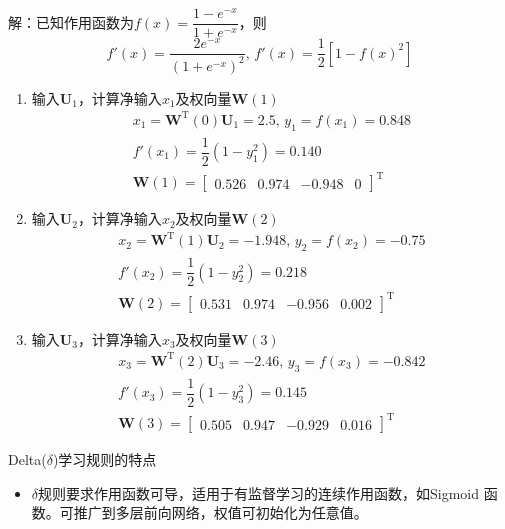 \begin{example}
    \textcolor{main1}{解：}已知作用函数为$f(x) = \dfrac{1-e^{-x}}{1+e^{-x}}$，则
    \[
        f'(x) = \dfrac{2e^{-x}}{\left( 1+e^{-x} \right)^2},\,f'(x) = \dfrac{1}{2}\left[ 1-f(x)^2 \right]
    \]
    \begin{enumerate}
        \item 输入$\boldsymbol{U}_1$，计算净输入$x_{1}$及权向量$\boldsymbol{W}(1)$
        \[
            \begin{array}{l}
                x_1 = \boldsymbol{W}^{\mathrm{T}}(0)\boldsymbol{U}_1 = 2.5,\, y_{1} = f(x_1) = 0.848\\
                f'(x_1) = \dfrac{1}{2}(1-y_1^2) = 0.140\\
                \boldsymbol{W}(1) = \begin{bmatrix}
                    0.526 & 0.974 & -0.948 & 0 
                \end{bmatrix}^{\mathrm{T}}
            \end{array}
        \]
        \item 输入$\boldsymbol{U}_2$，计算净输入$x_{2}$及权向量$\boldsymbol{W}(2)$
        \[
            \begin{array}{l}
                x_2 = \boldsymbol{W}^{\mathrm{T}}(1)\boldsymbol{U}_2 = -1.948,\, y_{2} = f(x_2) = -0.75\\
                f'(x_2) = \dfrac{1}{2}(1-y_2^2) = 0.218\\
                \boldsymbol{W}(2) = \begin{bmatrix}
                    0.531 & 0.974 & -0.956 & 0.002
                \end{bmatrix}^{\mathrm{T}}
            \end{array}
        \]
        \item 输入$\boldsymbol{U}_3$，计算净输入$x_{3}$及权向量$\boldsymbol{W}(3)$
        \[
            \begin{array}{l}
                x_3 = \boldsymbol{W}^{\mathrm{T}}(2)\boldsymbol{U}_3 = -2.46,\, y_{3} = f(x_3) = -0.842\\
                f'(x_3) = \dfrac{1}{2}(1-y_3^2) = 0.145\\
                \boldsymbol{W}(3) = \begin{bmatrix}
                    0.505 & 0.947 & -0.929 & 0.016
                \end{bmatrix}^{\mathrm{T}}
            \end{array}
        \]
    \end{enumerate}
\end{example}
\begin{note}
    Delta($\delta$)学习规则的特点
    \begin{itemize}
        \item $\delta$规则要求\textcolor{main1}{作用函数可导}，适用于有监督学习的连续作用函数，如Sigmoid 函数。可推广到多层前向网络，权值可初始化为任意值。
    \end{itemize}
\end{note}
